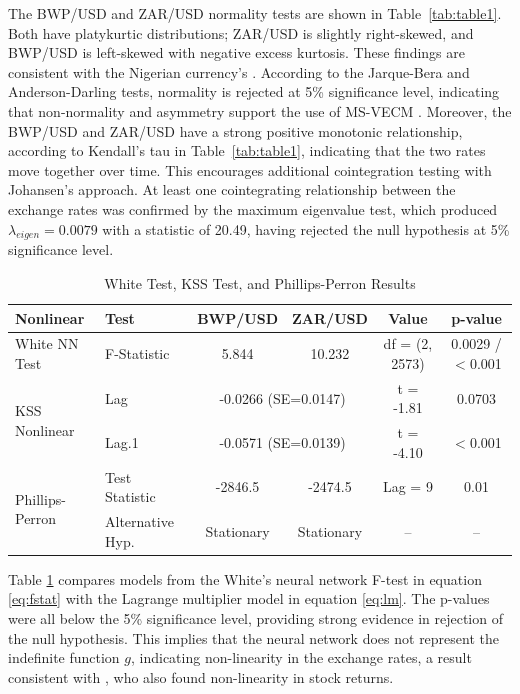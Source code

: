 \documentclass[a4paper]{article}
\theoremstyle{plain}
\theoremstyle{definition}
\theoremstyle{remark}
\begin{document}
\newline
The BWP/USD and ZAR/USD normality tests are shown in Table~\ref{tab:table1}. Both have platykurtic distributions; ZAR/USD is slightly right-skewed, and BWP/USD is left-skewed with negative excess kurtosis. These findings are consistent with the Nigerian currency's \cite{aliyu2023statistical}. According to the Jarque-Bera and Anderson-Darling tests, normality is rejected at 5\% significance level, indicating that non-normality and asymmetry support the use of MS-VECM \citep{makatjane2024forecasting, hamilton2013advances}. Moreover, the BWP/USD and ZAR/USD have a strong positive monotonic relationship, according to Kendall's tau in Table~\ref{tab:table1}, indicating that the two rates move together over time. This encourages additional cointegration testing with Johansen's approach. At least one cointegrating relationship between the exchange rates was confirmed by the maximum eigenvalue test, which produced $\lambda_{eigen}=0.0079$ with a statistic of 20.49, having rejected the null hypothesis at 5\% significance level.

\begin{table}[ht]
\centering
\caption{White Test, KSS Test, and Phillips-Perron Results}
\label{tab:page2_results}
\scriptsize
\vspace{0.3cm}
\begin{tabular}{llcccc}
\toprule
\textbf{Nonlinear} & \textbf{Test} & \textbf{BWP/USD} & \textbf{ZAR/USD} & \textbf{Value} & \textbf{p-value} \\
\midrule
\multirow{1}{*}{White NN Test}
  & F-Statistic & 5.844 & 10.232 & df = (2, 2573) & 0.0029 / $<$0.001 \\
\midrule
\multirow{2}{*}{KSS Nonlinear}
  & Lag & \multicolumn{2}{c}{-0.0266 (SE=0.0147)} & t = -1.81 & 0.0703 \\
  & Lag.1 & \multicolumn{2}{c}{-0.0571 (SE=0.0139)} & t = -4.10 & $<$0.001 \\
\midrule
\multirow{2}{*}{Phillips-Perron}
  & Test Statistic & -2846.5 & -2474.5 & Lag = 9 & 0.01 \\
  & Alternative Hyp. & Stationary & Stationary & -- & -- \\
\bottomrule
\end{tabular}
\end{table}
Table \ref{tab:page2_results} compares models from the White's neural network F-test in equation \ref{eq:fstat} with the Lagrange multiplier model in equation \ref{eq:lm}. The p-values were all below the 5\% significance level, providing strong evidence in rejection of the null hypothesis. This implies that the neural network does not represent the indefinite function $g$, indicating non-linearity in the exchange rates, a result consistent with \cite{Makatjane2017Application}, who also found non-linearity in stock returns.
\end{document}
